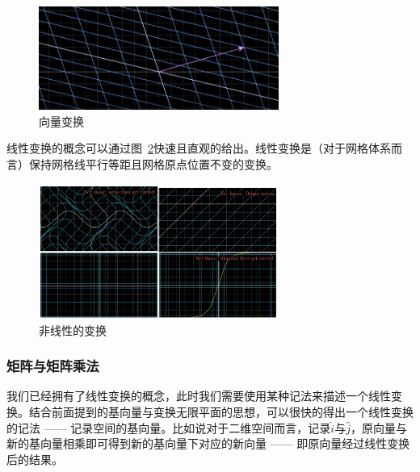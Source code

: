 \documentclass[UTF8]{ctexart}
\begin{document}
\begin{figure}[hb]
    \centering
    \includegraphics[width=0.7\textwidth]{./figs/grid_transform.png}
    \caption{向量变换}
    \label{fig:grid_transform}
\end{figure}

线性变换的概念可以通过图~\ref{fig:linear_transform}快速且直观的给出。线性变换是（对于网格体系而言）保持网格线平行等距且网格原点位置不变的变换。

\begin{figure}[hb]
    \centering
    \includegraphics[width=0.7\textwidth]{./figs/linear_transformation.png}
    \caption{非线性的变换}
    \label{fig:linear_transform}
\end{figure}

\subsubsection{矩阵与矩阵乘法}
我们已经拥有了线性变换的概念，此时我们需要使用某种记法来描述一个线性变换。结合前面提到的基向量与变换无限平面的思想，可以很快的得出一个线性变换的记法 —— 记录空间的基向量。比如说对于二维空间而言，记录$\hat{i}$与$\hat{j}$，原向量与新的基向量相乘即可得到新的基向量下对应的新向量 —— 即原向量经过线性变换后的结果。
\end{document}
